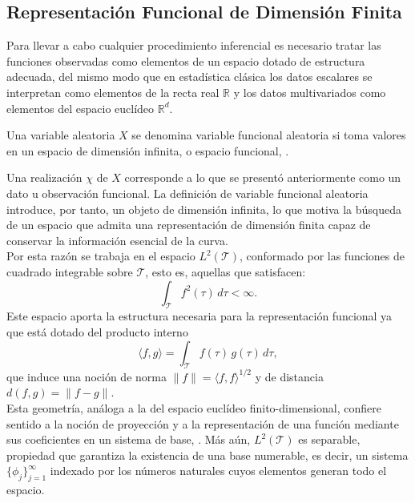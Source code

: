 \subsection{Representación Funcional de Dimensión Finita}
\label{02_01_01_representacion_funcional}
Para llevar a cabo cualquier procedimiento inferencial es necesario tratar las funciones observadas como elementos de un espacio dotado de estructura adecuada, del mismo modo que en estadística clásica los datos escalares se interpretan como elementos de la recta real $\mathbb{R}$ y los datos multivariados como elementos del espacio euclídeo $\mathbb{R}^d$.

\begin{definition}
    Una variable aleatoria $X$ se denomina variable funcional aleatoria si toma valores en un espacio de dimensión infinita, o espacio funcional, \cite{02_01_ferraty2006nonparametric}.
\end{definition}

Una realización $\chi$ de $X$ corresponde a lo que se presentó anteriormente como un dato u observación funcional. La definición de variable funcional aleatoria introduce, por tanto, un objeto de dimensión infinita, lo que motiva la búsqueda de un espacio que admita una representación de dimensión finita capaz de conservar la información esencial de la curva.\\

Por esta razón se trabaja en el espacio $L^2(\mathcal{T})$, conformado por las funciones de cuadrado integrable sobre $\mathcal{T}$, esto es, aquellas que satisfacen:
\begin{equation}
    \int_{\mathcal{T}} f^2(\tau)\,d\tau < \infty.
\end{equation}
Este espacio aporta la estructura necesaria para la representación funcional ya que está dotado del producto interno
\begin{equation}
    \langle f, g \rangle = \int_{\mathcal{T}} f(\tau)\,g(\tau)\,d\tau,
\end{equation}
que induce una noción de norma $\|f\| = \langle f, f\rangle^{1/2}$ y de distancia $d(f,g) = \|f - g\|$.\\

Esta geometría, análoga a la del espacio euclídeo finito-dimensional, confiere sentido a la noción de proyección y a la representación de una función mediante sus coeficientes en un sistema de base, \cite{02_01_kokoszka2017introduction}. Más aún, $L^2(\mathcal{T})$ es separable, propiedad que garantiza la existencia de una base numerable, es decir, un sistema $\{\phi_j\}_{j=1}^{\infty}$ indexado por los números naturales cuyos elementos generan todo el espacio.\\

